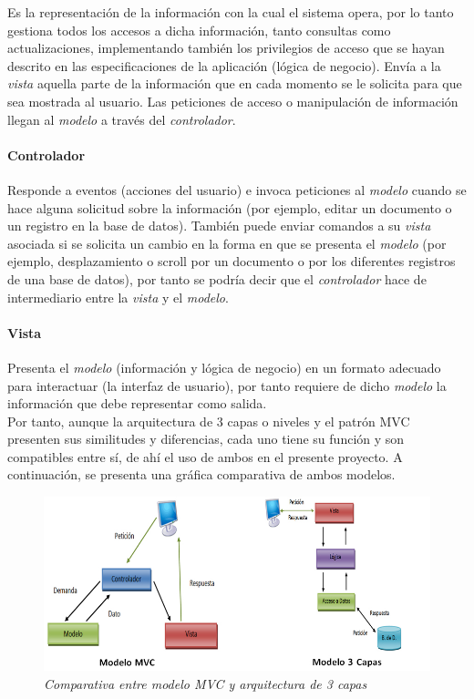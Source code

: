 Es la representación de la información con la cual el sistema opera, por lo tanto gestiona todos los accesos a dicha información, tanto consultas como actualizaciones, implementando también los privilegios de acceso que se hayan descrito en las especificaciones de la aplicación (lógica de negocio). Envía a la \textit{vista} aquella parte de la información que en cada momento se le solicita para que sea mostrada al usuario. Las peticiones de acceso o manipulación de información llegan al \textit{modelo} a través del \textit{controlador}.

\paragraph*{Controlador}

Responde a eventos (acciones del usuario) e invoca peticiones al \textit{modelo} cuando se hace alguna solicitud sobre la información (por ejemplo, editar un documento o un registro en la base de datos). También puede enviar comandos a su \textit{vista} asociada si se solicita un cambio en la forma en que se presenta el \textit{modelo} (por ejemplo, desplazamiento o scroll por un documento o por los diferentes registros de una base de datos), por tanto se podría decir que el \textit{controlador} hace de intermediario entre la \textit{vista}  y el \textit{modelo}.

\paragraph*{Vista}

Presenta el \textit{modelo} (información y lógica de negocio) en un formato adecuado para interactuar (la interfaz de usuario), por tanto requiere de dicho \textit{modelo} la información que debe representar como salida.\\

Por tanto, aunque la arquitectura de 3 capas o niveles y el patrón MVC presenten sus similitudes y diferencias, cada uno tiene su función y son compatibles entre sí, de ahí el uso de ambos en el presente proyecto. A continuación, se presenta una gráfica comparativa de ambos modelos. 

\vspace{10mm}

\begin{figure}[H]
\centering
  \includegraphics[scale=.50]{img/MVC-vs-3-capas.jpg}
  \caption{\textit{Comparativa entre modelo MVC y arquitectura de 3 capas}}
  \label{fig:MVC-vs-3-capas}
\end{figure}

